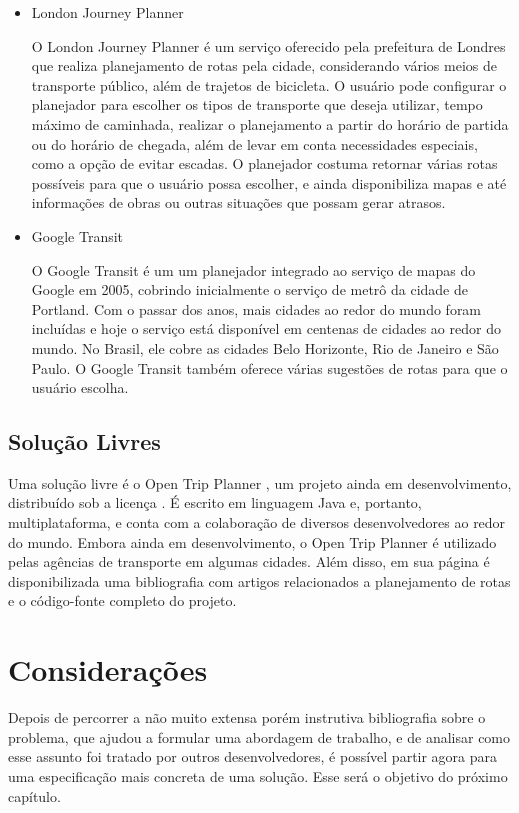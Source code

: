 \begin{itemize}

\item London Journey Planner \cite{tfl}

O London Journey Planner é um serviço oferecido pela prefeitura de Londres que realiza planejamento de rotas pela cidade, considerando vários meios de transporte público, além de trajetos de bicicleta. O usuário pode configurar o planejador para escolher os tipos de transporte que deseja utilizar, tempo máximo de caminhada, realizar o planejamento a partir do horário de partida ou do horário de chegada, além de levar em conta necessidades especiais, como a opção de evitar escadas. O planejador costuma retornar várias rotas possíveis para que o usuário possa escolher, e ainda disponibiliza mapas e até informações de obras ou outras situações que possam gerar atrasos.

\item Google Transit \cite{googletransit}

O Google Transit é um um planejador integrado ao serviço de mapas do Google em 2005, cobrindo inicialmente o serviço de metrô da cidade de Portland. Com o passar dos anos, mais cidades ao redor do mundo foram incluídas e hoje o serviço está disponível em centenas de cidades ao redor do mundo. No Brasil, ele cobre as cidades Belo Horizonte, Rio de Janeiro e São Paulo. O Google Transit também oferece várias sugestões de rotas para que o usuário escolha.

\end{itemize}

\subsection{Solução Livres}

Uma solução livre é o Open Trip Planner \cite{otp}, um projeto ainda em desenvolvimento, distribuído sob a licença . É escrito em linguagem Java e, portanto, multiplataforma, e conta com a colaboração de diversos desenvolvedores ao redor do mundo. Embora ainda em desenvolvimento, o Open Trip Planner é utilizado pelas agências de transporte em algumas cidades. Além disso, em sua página é disponibilizada uma bibliografia com artigos relacionados a planejamento de rotas e o código-fonte completo do projeto.

\section{Considerações}

Depois de percorrer a não muito extensa porém instrutiva bibliografia sobre o problema, que ajudou a formular uma abordagem de trabalho, e de analisar como esse assunto foi tratado por outros desenvolvedores, é possível partir agora para uma especificação mais concreta de uma solução. Esse será o objetivo do próximo capítulo.

